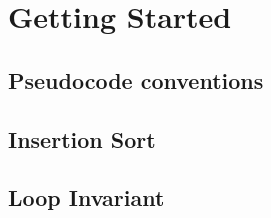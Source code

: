 \chapter{Getting Started}
\section{Pseudocode conventions}

\section{Insertion Sort}
\section{Loop Invariant}
